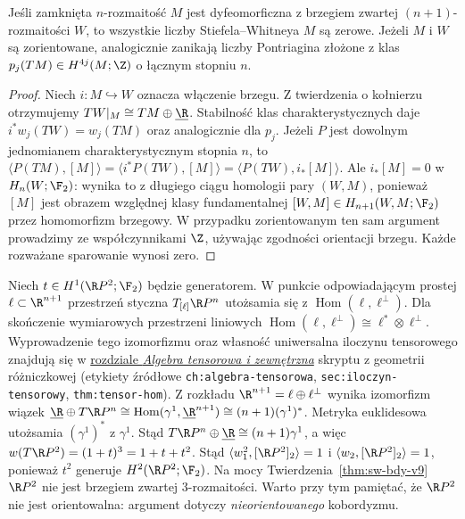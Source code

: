\begin{twierdzenie}
\label{thm:sw-bdy-v9}
Jeśli zamknięta $n$-rozmaitość $M$ jest dyfeomorficzna
z brzegiem zwartej $(n+1)$-rozmaitości $W$, to
wszystkie liczby Stiefela--Whitneya $M$ są zerowe.
Jeżeli $M$ i $W$ są zorientowane, analogicznie
zanikają liczby Pontriagina złożone z klas
$p_j(TM)\in H^{4j}(M;\Z)$ o łącznym stopniu $n$.
\end{twierdzenie}
\begin{proof}
Niech $i:M\hookrightarrow W$ oznacza włączenie brzegu.
Z twierdzenia o kołnierzu otrzymujemy
$TW|_M\cong TM\oplus\underline\R$.
Stabilność klas charakterystycznych daje
$i^*w_j(TW)=w_j(TM)$ oraz analogicznie dla $p_j$.
Jeżeli $P$ jest dowolnym jednomianem charakterystycznym
stopnia $n$, to
$\langle P(TM),[M]\rangle=
\langle i^*P(TW),[M]\rangle=
\langle P(TW),i_*[M]\rangle$.
Ale $i_*[M]=0$ w $H_n(W;\F_2)$:
wynika to z długiego ciągu homologii pary $(W,M)$,
ponieważ $[M]$ jest obrazem względnej klasy fundamentalnej
$[W,M]\in H_{n+1}(W,M;\F_2)$ przez homomorfizm brzegowy.
W przypadku zorientowanym ten sam argument prowadzimy
ze współczynnikami $\Z$, używając zgodności
orientacji brzegu. Każde rozważane sparowanie wynosi zero.
\end{proof}

\begin{przyklad}
Niech $t\in H^1(\R P^2;\F_2)$ będzie generatorem.
W punkcie odpowiadającym prostej $\ell\subset\R^{n+1}$
przestrzeń styczna $T_{[\ell]}\R P^n$ utożsamia się
z $\operatorname{Hom}(\ell,\ell^\perp)$.
Dla skończenie wymiarowych przestrzeni liniowych
$\operatorname{Hom}(\ell,\ell^\perp)\cong\ell^*\otimes\ell^\perp$.
Wyprowadzenie tego izomorfizmu oraz własność uniwersalna
iloczynu tensorowego znajdują się w
\href{https://github.com/dariusz-piekarz/mathematical_scipts/blob/biblioteka-matematyczna-iteracja-6/chapters/pl/differential_geometry_and_topology/03-algebra-tensorowa-i-zewnetrzna.tex}{rozdziale \emph{Algebra tensorowa i zewnętrzna}}
skryptu z geometrii różniczkowej
(etykiety źródłowe \texttt{ch:algebra-tensorowa},
\texttt{sec:iloczyn-tensorowy}, \texttt{thm:tensor-hom}).
Z rozkładu
$\R^{n+1}=\ell\oplus\ell^\perp$ wynika izomorfizm
wiązek
$\underline\R\oplus T\R P^n
\cong\operatorname{Hom}(\gamma^1,\underline\R^{n+1})
\cong(n+1)(\gamma^1)^*$.
Metryka euklidesowa utożsamia $(\gamma^1)^*$ z
$\gamma^1$. Stąd
$T\R P^n\oplus\underline\R\cong(n+1)\gamma^1$,
a więc $w(T\R P^2)=(1+t)^3=1+t+t^2$.
Stąd $\langle w_1^2,[\R P^2]_2\rangle=1$ i
$\langle w_2,[\R P^2]_2\rangle=1$, ponieważ
$t^2$ generuje $H^2(\R P^2;\F_2)$.
Na mocy Twierdzenia~\ref{thm:sw-bdy-v9}
$\R P^2$ nie jest brzegiem zwartej $3$-rozmaitości.
Warto przy tym pamiętać, że $\R P^2$ nie jest
orientowalna: argument dotyczy \emph{nieorientowanego}
kobordyzmu.
\end{przyklad}

